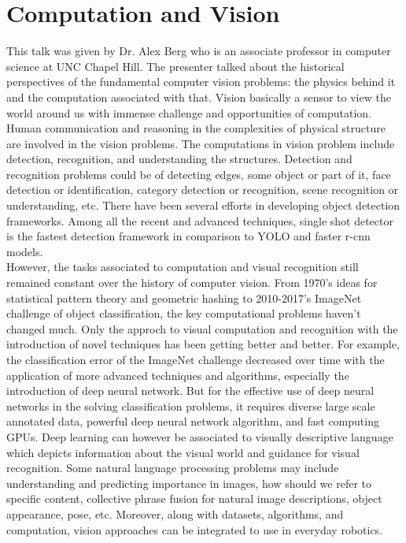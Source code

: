 \documentclass{report}
\begin{document}
\newpage

\section{Computation and Vision}
This talk was given by Dr. Alex Berg who is an associate professor in computer science at UNC Chapel Hill. The presenter talked about the historical perspectives of the fundamental computer vision problems: the physics behind it and the computation associated with that. Vision basically a sensor to view the world around us with immense challenge and opportunities of computation. Human communication and reasoning in the complexities of physical structure are involved in the vision problems. The computations in vision problem include detection, recognition, and understanding the structures. Detection and recognition problems could be of detecting edges, some object or part of it, face detection or identification, category detection or recognition, scene recognition or understanding, etc. There have been several efforts in developing object detection frameworks. Among all the recent and advanced techniques, single shot detector is the fastest detection framework in comparison to YOLO and faster r-cnn models. \\  

However, the tasks associated to computation and visual recognition still remained constant over the history of computer vision. From 1970's ideas for statistical pattern theory and geometric hashing to 2010-2017's ImageNet challenge of object classification, the key computational problems haven't changed much. Only the approch to visual computation and recognition with the introduction of novel techniques has been getting better and better. For example, the classification error of the ImageNet challenge decreased over time with the application of more advanced techniques and algorithms, especially the introduction of deep neural network. But for the effective use of deep neural networks in the solving classification problems, it requires diverse large scale annotated data, powerful deep neural network algorithm, and fast computing GPUs. Deep learning can however be associated to visually descriptive language which depicts information about the visual world and guidance for visual recognition. Some natural language processing problems may include understanding and predicting importance in images, how should we refer to specific content, collective phrase fusion for natural image descriptions, object appearance, pose, etc. Moreover, along with datasets, algorithms, and computation, vision approaches can be integrated to use in everyday robotics.      
\end{document}
